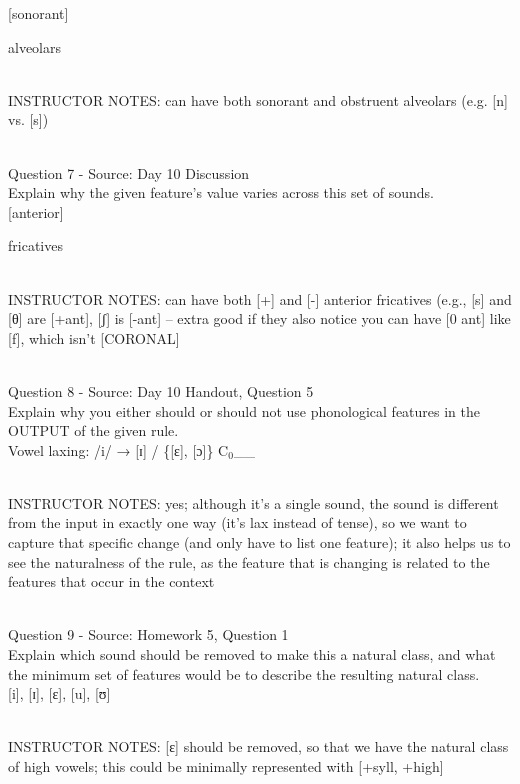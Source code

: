 \documentclass[12pt]{article}
\begin{document}
{[sonorant]}

alveolars


~\\
INSTRUCTOR NOTES: can have both sonorant and obstruent alveolars (e.g. [n] vs. [s])


~\\

{\large Question 7} - Source: Day 10 Discussion\\

Explain why the given feature's value varies across this set of sounds.\\

{[anterior]}

fricatives


~\\
INSTRUCTOR NOTES: can have both [+] and [-] anterior fricatives (e.g., [s] and [θ] are [+ant], [ʃ] is [-ant] -- extra good if they also notice you can have [0 ant] like [f], which isn't [CORONAL]


~\\

{\large Question 8} - Source: Day 10 Handout, Question 5\\

Explain why you either should or should not use phonological features in the OUTPUT of the given rule.\\

Vowel laxing: /i/ → {[ɪ]} / \{{[ɛ]}, {[ɔ]}\} C$_0$\_\_


~\\
INSTRUCTOR NOTES: yes; although it's a single sound, the sound is different from the input in exactly one way (it's lax instead of tense), so we want to capture that specific change (and only have to list one feature); it also helps us to see the naturalness of the rule, as the feature that is changing is related to the features that occur in the context


~\\

{\large Question 9} - Source: Homework 5, Question 1\\

Explain which sound should be removed to make this a natural class, and what the minimum set of features would be to describe the resulting natural class.\\

{[i]}, {[ɪ]}, {[ɛ]}, {[u]}, {[ʊ]}


~\\
INSTRUCTOR NOTES: [ɛ] should be removed, so that we have the natural class of high vowels; this could be minimally represented with [+syll, +high]
\end{document}
